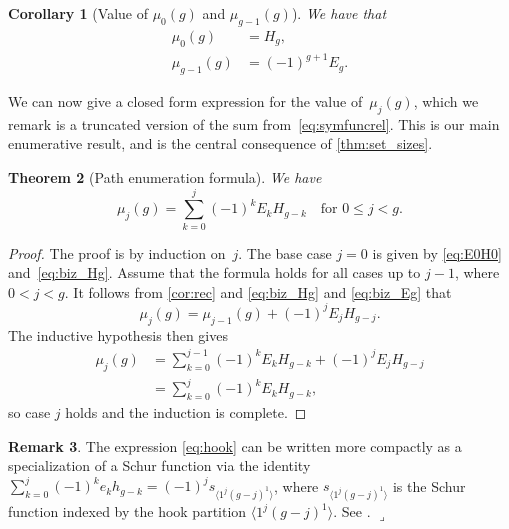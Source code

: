\documentclass[11pt]{article}
\newcommand{\lrcornerqed}[0]{}
\renewcommand{\lrcornerqed}[0]{\hfill $\lrcorner$} %
\newtheorem{thm}{Theorem}[section] %
\newtheorem{cor}[thm]{Corollary}
\theoremstyle{definition} %
\numberwithin{equation}{section}
\newtheorem{remark}[thm]{Remark}
\begin{document}
\begin{cor}[Value of $\mu_0(g)$ and $\mu_{g-1}(g)$]
\label{thm:bizley}
    We have that 
    \begin{align}
        \mu_0(g) &= {H}_g,\label{eq:biz_Hg}\\
        \mu_{g-1}(g) &= (-1)^{g+1}{E}_g.\label{eq:biz_Eg}
    \end{align}
\end{cor}

We can now give a closed form expression for the value of~$\mu_j(g)$, which we remark is a truncated version of the sum from~\eqref{eq:symfuncrel}. 
This is our main enumerative result, and is the central consequence of \cref{thm:set_sizes}.

\begin{thm}[Path enumeration formula]
\label{thm:path_counting_formula}
    We have
    \begin{equation}
         \mu_j(g) = \sum_{k=0}^j (-1)^k
        {E}_k {H}_{g-k}
        \quad \mbox{for $0 \le j < g$.}
    \end{equation}
\end{thm}
\begin{proof}
    The proof is by induction on~$j$. The base case
    $j=0$ is given by \eqref{eq:E0H0} and~\eqref{eq:biz_Hg}.
    Assume that the formula holds for all cases up to $j-1$, where $0 < j < g$.
    It follows from \cref{cor:rec} and \eqref{eq:biz_Hg} and \eqref{eq:biz_Eg} that
        \[
        \mu_j(g) = \mu_{j-1}(g) + (-1)^{j}{E}_{j}{H}_{g-j}.
        \]
    The inductive hypothesis then gives
    \begin{align}
        \mu_j(g)
        &= \sum_{k=0}^{j-1} (-1)^{k}{E}_{k}{H}_{g-k} + (-1)^{j}{E}_{j}{H}_{g-j}\\
        &= \sum_{k=0}^j (-1)^{k}{E}_{k}{H}_{g-k}, \label{eq:hook}
    \end{align}
    so case $j$ holds and the induction is complete.

\end{proof}

\begin{remark}
    The expression \eqref{eq:hook} can be written more compactly as a specialization of a Schur function via the identity $\sum_{k=0}^j (-1)^k e_k h_{g-k} = (-1)^j s_{\langle 1^j (g-j)^1 \rangle}$, where $s_{\langle 1^j (g-j)^1 \rangle}$ is the Schur function indexed by the hook partition $\langle 1^j (g-j)^1 \rangle$.  See \cite[Section I.3, Example 9]{macdonald}.
    \lrcornerqed
\end{remark}
\end{document}
